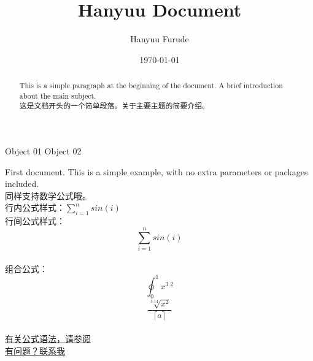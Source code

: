 \documentclass[12pt, a4papper]{ctexart}
\title{Hanyuu Document}
\author{Hanyuu Furude}
\date{\today}
\begin{document}
\begin{titlepage}
\maketitle
\end{titlepage}
\tableofcontents
Object 01
Object 02
\begin{abstract}
This is a simple paragraph at the beginning of the document. A brief introduction about the main subject.  \\
这是文档开头的一个简单段落。关于主要主题的简要介绍。
\end{abstract}
First document. This is a simple example, with no extra parameters or packages included.\\
同样支持数学公式哦。\\
行内公式样式：$\sum_{i=1}^{n}sin\left(i\right)$\\
行间公式样式：$$\sum_{i=1}^{n}sin\left(i\right)$$\\
组合公式：
\begin{equation}
		\oint_{0}^{1}x^{3.2}
\end{equation}
\begin{equation}
	\frac{\sqrt[3.14]{x^2}}{\lceil a \rceil}
\end{equation}\\
\href{https://hanyuufurude.github.io/Others/Latex/}{有关公式语法，请参阅}\\
\href{mailto:Furude_Hanyuu@outlook.com}{有问题？联系我}\\
\setcounter{page}{page number}
\begin{comment}
This text won't show up in the compiled pdf this is just a multi-line comment. Useful to, for instance, comment out slow-rendering while working on the draft.
\end{comment}
\end{document}
